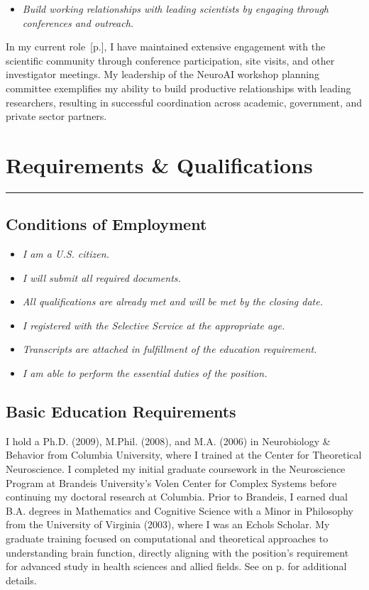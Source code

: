 \documentclass[10pt]{article}
\newcommand{\see}[1]{[\textcolor{hopkinsblue}{p.\pageref{sec:#1}}]}
\newcommand{\cf}[1]{\textcolor{hopkinsblue}{See \emph{\nameref{sec:#1}} on p.\pageref{sec:#1}}}
\begin{document}
\begin{itemize}
  \color{hopkinsblue}
  \item \emph{Build working relationships with leading scientists by engaging
through conferences and outreach.}
\end{itemize}

In my current role~\see{jobobd}, I have maintained extensive engagement with
the scientific community through conference participation, site visits, and
other investigator meetings. My leadership of the NeuroAI workshop planning
committee exemplifies my ability to build productive relationships with leading
researchers, resulting in successful coordination across academic, government,
and private sector partners.

\pagebreak
\section*{Requirements \& Qualifications}
\label{sec:basicreqs}
\vspace{-.1in}
\hrule
\vspace{.3in}

\subsection*{Conditions of Employment}

\begin{itemize}
  \item \emph{I am a U.S. citizen.}
  \item \emph{I will submit all required documents.}
  \item \emph{All qualifications are already met and will be met by the closing date.}
  \item \emph{I registered with the Selective Service at the appropriate age.}
  \item \emph{Transcripts are attached in fulfillment of the education requirement.}
  \item \emph{I am able to perform the essential duties of the position.}
\end{itemize}

\subsection*{Basic Education Requirements}

I hold a Ph.D. (2009), M.Phil. (2008), and M.A. (2006) in Neurobiology \&
Behavior from Columbia University, where I trained at the Center for Theoretical
Neuroscience. I completed my initial graduate coursework in the Neuroscience
Program at Brandeis University's Volen Center for Complex Systems before
continuing my doctoral research at Columbia. Prior to Brandeis, I earned dual
B.A. degrees in Mathematics and Cognitive Science with a Minor in Philosophy
from the University of Virginia (2003), where I was an Echols Scholar. My
graduate training focused on computational and theoretical approaches to
understanding brain function, directly aligning with the position's requirement
for advanced study in health sciences and allied fields. \cf{education} for
additional details.
\end{document}
